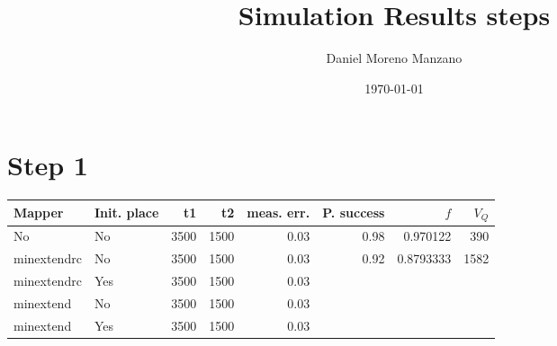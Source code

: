 \documentclass[11pt]{article}
\author{Daniel Moreno Manzano}
\date{\today}
\title{Simulation Results steps}
\begin{document}
\maketitle


\section{Step 1}
\label{sec:orga88001e}

\begin{center}
\begin{tabular}{llrrrrrr}
\hline
Mapper & Init. place & t1 & t2 & meas. err. & P. success & \(f\) & \(V_Q\)\\
\hline
No & No & 3500 & 1500 & 0.03 & 0.98 & 0.970122 & 390\\
minextendrc & No & 3500 & 1500 & 0.03 & 0.92 & 0.8793333 & 1582\\
minextendrc & Yes & 3500 & 1500 & 0.03 &  &  & \\
minextend & No & 3500 & 1500 & 0.03 &  &  & \\
minextend & Yes & 3500 & 1500 & 0.03 &  &  & \\
\hline
\end{tabular}
\end{center}
\end{document}
